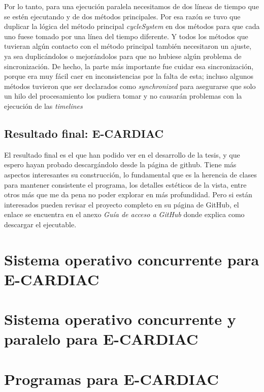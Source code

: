 \documentclass[letterpaper,12pt,oneside]{book}
\begin{document}
	Por lo tanto, para una ejecución paralela necesitamos de dos líneas de tiempo que se estén ejecutando y de dos métodos principales. Por esa razón se tuvo que duplicar
	la lógica del método principal \textit{cycleSystem} en dos métodos para que cada uno fuese tomado por una línea del tiempo diferente. Y todos los métodos
	que tuvieran algún contacto con el método principal también necesitaron un ajuste, ya sea duplicándolos o mejorándolos para que no hubiese algún problema de 
	sincronización. De hecho, la parte más importante fue cuidar esa sincronización, porque era muy fácil caer en inconsistencias por la falta de esta; incluso
	algunos métodos tuvieron que ser declarados como \textit{synchronized} para asegurarse que solo un hilo del procesamiento los pudiera tomar
	y no causarán problemas con la ejecución de las \textit{timelines}
	
	
	\section{Resultado final: E-CARDIAC}
	
	El resultado final es el que han podido ver en el desarrollo de la tesis, y que espero hayan probado descargándolo desde la página de github. Tiene más aspectos
	interesantes su construcción, lo fundamental que es la herencia de clases para mantener consistente el programa, los detalles estéticos de la vista, entre
	otros más que me da pena no poder explorar en más profundidad. Pero si están interesados pueden revisar el proyecto completo en su página de GitHub, el enlace se
	encuentra en el anexo \textit{Guía de acceso a GitHub} donde explica como descargar el ejecutable.
	
	

\chapter{Sistema operativo concurrente para E-CARDIAC}


\chapter{Sistema operativo concurrente y paralelo para E-CARDIAC}


\chapter{Programas para E-CARDIAC} \label{app:programasEcardiac}

\end{document}
